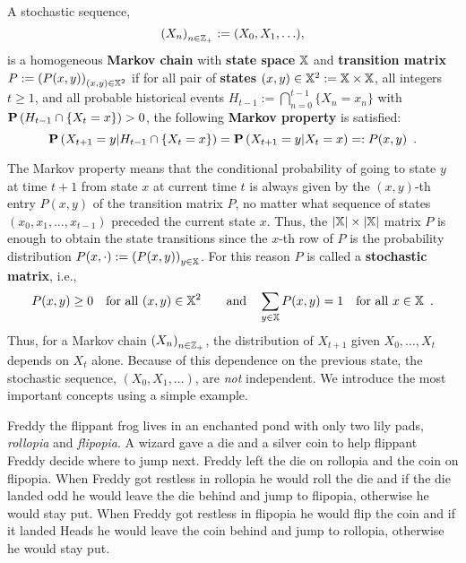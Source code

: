 {\begin{definition}\label{D:TimeHomFiniteMC}
A stochastic sequence, $$\left(X_n\right)_{n \in \mathbb{Z}_+} := (X_0,X_1,\ldots),$$ is a homogeneous {\bf Markov chain} with {\bf state space} $\mathbb{X}$ and {\bf transition matrix} $P:=\left(P(x,y)\right)_{(x,y)\in \mathbb{X}^2}$ if for all pair of {\bf states} ${(x,y)\in \mathbb{X}^2 := \mathbb{X} \times \mathbb{X}}$, all integers $t \geq 1$, and all probable historical events $H_{t-1} := \bigcap_{n=0}^{t-1} \{ X_n = x_n \}$ with $\mathbf{P} \left(H_{t-1} \cap \{X_t = x\} \right) > 0$, the following {\bf Markov property} is satisfied: 
\begin{equation}\label{E:FiniteMarkovProperty}
\mathbf{P}\left(X_{t+1} = y | H_{t-1} \cap \{X_t = x\} \right)=\mathbf{P}\left(X_{t+1} = y | X_t = x \right) =: P(x,y) \enspace .
\end{equation}
\end{definition}
The Markov property means that the conditional probability of going to state $y$ at time $t+1$ from state $x$ at current time $t$ is always given by the $(x,y)$-th entry $P(x,y)$ of the transition matrix $P$, no matter what sequence of states $(x_0,x_1,\ldots,x_{t-1})$ preceded the current state $x$.  Thus, the $|\mathbb{X}| \times |\mathbb{X}|$ matrix $P$ is enough to obtain the state transitions since the $x$-th row of $P$ is the probability distribution $P(x,\cdot) := \left( P(x,y) \right)_{y \in \mathbb{X}}$.  For this reason $P$ is called a {\bf stochastic matrix}, i.e.,
\begin{equation}\label{E:StochasticMatrixConds}
P(x,y) \geq 0 \quad \text{for all } (x,y) \in \mathbb{X}^2 \qquad \text{and} \quad \sum_{y \in \mathbb{X}} P(x,y) = 1 \quad \text{for all } x \in \mathbb{X} \enspace .
\end{equation}
Thus, for a Markov chain $\left(X_n\right)_{n \in \mathbb{Z}_+}$, the distribution of $X_{t+1}$ given $X_0,\ldots,X_t$  depends on $X_t$ alone. Because of this dependence on the previous state, the stochastic sequence, $(X_0,X_1,\ldots)$, are {\it not} independent.  We introduce the most important concepts using a simple example.

\begin{example}\label{EX:FlippantFreddy}
Freddy the flippant frog lives in an enchanted pond with only two lily pads, {\em rollopia} and {\em flipopia}.  A wizard gave a  die and a silver coin to help flippant Freddy decide where to jump next.  Freddy left the die on rollopia and the coin on flipopia.  When Freddy got restless in rollopia he would roll the die and if the die landed odd he would leave the die behind and jump to flipopia, otherwise he would stay put.  When Freddy got restless in flipopia he would flip the coin and if it landed Heads he would leave the coin behind and jump to rollopia, otherwise he would stay put.


\end{example}}

